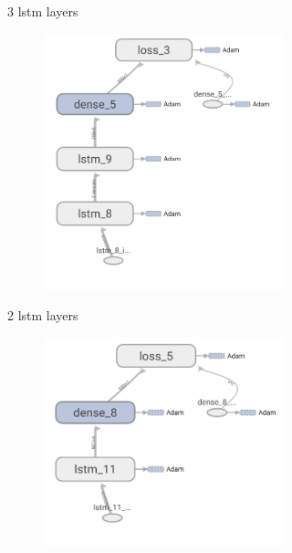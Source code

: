 \begin{figure}
\begin{subfigure}[b]{0.3\linewidth}
\begin{subfigure}[b]{\linewidth}
		\end{subfigure}
		\caption{3 lstm layers}
	\end{subfigure}
	\begin{subfigure}[b]{0.3\linewidth}
		\begin{subfigure}[b]{\linewidth}
			\includegraphics[width=\linewidth]{plots/rnn-candidates-2-lstm-1-dense.png}
		\end{subfigure}
		\caption{2 lstm layers}
	\end{subfigure}
	\begin{subfigure}[b]{0.3\linewidth}
		\begin{subfigure}[b]{\linewidth}
			\includegraphics[width=\linewidth]{plots/rnn-candidates-1-lstm-1-dense.png}

\end{subfigure}
\end{subfigure}
\end{figure}
